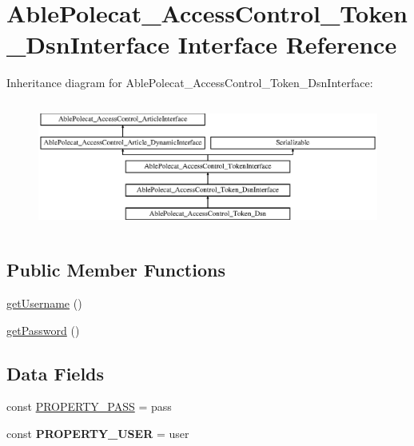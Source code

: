 \hypertarget{interface_able_polecat___access_control___token___dsn_interface}{}\section{Able\+Polecat\+\_\+\+Access\+Control\+\_\+\+Token\+\_\+\+Dsn\+Interface Interface Reference}
\label{interface_able_polecat___access_control___token___dsn_interface}
Inheritance diagram for Able\+Polecat\+\_\+\+Access\+Control\+\_\+\+Token\+\_\+\+Dsn\+Interface\+:\begin{figure}[H]
\begin{center}
\leavevmode
\includegraphics[height=4.268293cm]{interface_able_polecat___access_control___token___dsn_interface}
\end{center}
\end{figure}
\subsection*{Public Member Functions}
\begin{DoxyCompactItemize}
\item 
\hyperlink{interface_able_polecat___access_control___token___dsn_interface_a81b37a3c9d639574e394f80c1138c75e}{get\+Username} ()
\item 
\hyperlink{interface_able_polecat___access_control___token___dsn_interface_a04e0957baeb7acde9c0c86556da2d43f}{get\+Password} ()
\end{DoxyCompactItemize}
\subsection*{Data Fields}
\begin{DoxyCompactItemize}
\item 
const \hyperlink{interface_able_polecat___access_control___token___dsn_interface_a18bff7f0aa281c740adceccaeaeb3c89}{P\+R\+O\+P\+E\+R\+T\+Y\+\_\+\+P\+A\+S\+S} = \textquotesingle{}pass\textquotesingle{}
\item 
\hypertarget{interface_able_polecat___access_control___token___dsn_interface_a43682bdd2b2b4fb9814385fe8afce5e6}{}const {\bfseries P\+R\+O\+P\+E\+R\+T\+Y\+\_\+\+U\+S\+E\+R} = \textquotesingle{}user\textquotesingle{}\label{interface_able_polecat___access_control___token___dsn_interface_a43682bdd2b2b4fb9814385fe8afce5e6}

\end{DoxyCompactItemize}
